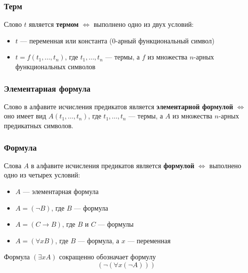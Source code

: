 \documentclass[11pt]{article}
\begin{document}
\subsubsection*{Терм}
\begin{definition}
    Слово $t$ является \textbf{термом} $\Longleftrightarrow$ выполнено одно из двух условий:
    \begin{itemize}
        \item $t$ --- переменная или константа (0-арный функциональный символ)
        \item $t = f(t_1, \dots, t_n)$, где $t_1, \dots, t_n$ --- термы, а $f$ 
        из множества $n$-арных функциональных символов
    \end{itemize}
\end{definition}

\subsubsection*{Элементарная формула}
\begin{definition}
    Слово в алфавите исчисления предикатов является \textbf{элементарной формулой}
    $\Longleftrightarrow$ оно имеет вид $A(t_1, \dots, t_n)$, где $t_1, \dots, t_n$
    --- термы, а $A$ из множества $n$-арных предикатных символов. 
\end{definition}

\subsubsection*{Формула}
\begin{definition}
    Слова $A$ в алфавите исчисления предикатов является \textbf{формулой} $\Longleftrightarrow$
    выполнено одно из четырех условий:
    \begin{itemize}
        \item $A$ --- элементарная формула 
        \item $A = (\lnot B)$, где $B$ --- формула 
        \item $A = (C \to B)$, где $B$ и $C$ --- формулы 
        \item $A = (\forall x B)$, где $B$ --- формула, а $x$ --- переменная
    \end{itemize}
\end{definition}

\begin{remark}
    Формула $(\exists x A)$ сокращенно обозначает формулу \[(\lnot (\forall x (\lnot A)))\]
\end{remark}
\end{document}
